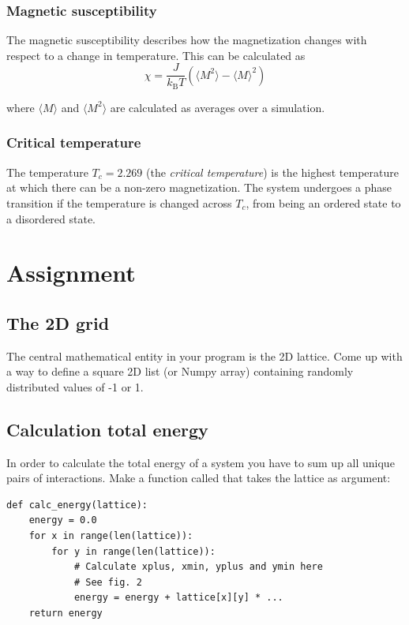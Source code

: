 \documentclass{article}
\begin{document}
\subsubsection{Magnetic susceptibility}

The magnetic susceptibility describes how the magnetization changes with respect to a change in temperature.
This can be calculated as
\begin{equation}
\chi = \frac{J}{k_{\mathrm{B}}T} \left( \langle M^2 \rangle - \langle M \rangle^2 \right)
\end{equation}

where $\langle M \rangle$ and $\langle M^2 \rangle$ are calculated as averages over a simulation.

\subsubsection{Critical temperature}

The temperature $T_c = 2.269$ (the \textit{critical temperature}) is the highest temperature at which there can be a non-zero magnetization.
The system undergoes a phase transition if the temperature is changed across $T_c$, from being an ordered state to a disordered state.

\newpage
\section{Assignment}
\subsection{The 2D grid}

The central mathematical entity in your program is the 2D lattice.
Come up with a way to define a square 2D list (or Numpy array) containing randomly distributed values of -1 or 1.

\subsection{Calculation total energy}

In order to calculate the total energy of a system you have to sum up all unique pairs of interactions. Make a function called  that takes the lattice as argument:

\begin{lstlisting}
def calc_energy(lattice):
    energy = 0.0
    for x in range(len(lattice)):
        for y in range(len(lattice)):
            # Calculate xplus, xmin, yplus and ymin here
            # See fig. 2
            energy = energy + lattice[x][y] * ...
    return energy
\end{lstlisting}
\end{document}
